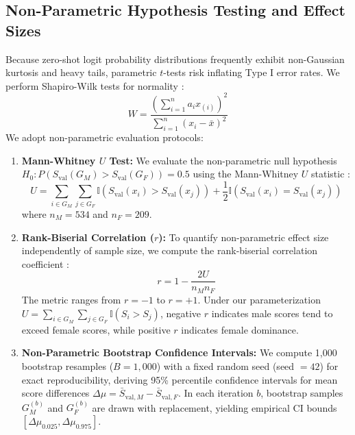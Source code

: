 \documentclass[pdflatex,sn-mathphys-num]{sn-jnl}%
\theoremstyle{thmstyleone}%
\theoremstyle{thmstyletwo}%
\theoremstyle{thmstylethree}%
\begin{document}
\subsection{Non-Parametric Hypothesis Testing and Effect Sizes}
Because zero-shot logit probability distributions frequently exhibit non-Gaussian kurtosis and heavy tails, parametric $t$-tests risk inflating Type I error rates. We perform Shapiro-Wilk tests for normality \cite{shapiro1965analysis}:
\begin{equation}
W = \frac{\left( \sum_{i=1}^{n} a_i x_{(i)} \right)^2}{\sum_{i=1}^{n} (x_i - \bar{x})^2}
\end{equation}
We adopt non-parametric evaluation protocols:
\begin{enumerate}
    \item \textbf{Mann-Whitney $U$ Test:} We evaluate the non-parametric null hypothesis $H_0: P(S_{\text{val}}(G_M) > S_{\text{val}}(G_F)) = 0.5$ using the Mann-Whitney $U$ statistic \cite{mann1947test}:
    \begin{equation}
    U = \sum_{i \in G_M} \sum_{j \in G_F} \mathbb{I}\left( S_{\text{val}}(x_i) > S_{\text{val}}(x_j) \right) + \frac{1}{2} \mathbb{I}\left( S_{\text{val}}(x_i) = S_{\text{val}}(x_j) \right)
    \end{equation}
    where $n_M = 534$ and $n_F = 209$.
    \item \textbf{Rank-Biserial Correlation ($r$):} To quantify non-parametric effect size independently of sample size, we compute the rank-biserial correlation coefficient \cite{mann1947test}:
    \begin{equation}
    r = 1 - \frac{2U}{n_M n_F}
    \end{equation}
    The metric ranges from $r = -1$ to $r = +1$. Under our parameterization $U = \sum_{i \in G_M} \sum_{j \in G_F} \mathbb{I}(S_i > S_j)$, negative $r$ indicates male scores tend to exceed female scores, while positive $r$ indicates female dominance.
    \item \textbf{Non-Parametric Bootstrap Confidence Intervals:} We compute 1,000 bootstrap resamples ($B=1,000$) with a fixed random seed (seed $= 42$) for exact reproducibility, deriving 95\% percentile confidence intervals for mean score differences $\Delta \mu = \bar{S}_{\text{val}, M} - \bar{S}_{\text{val}, F}$. In each iteration $b$, bootstrap samples $G_M^{(b)}$ and $G_F^{(b)}$ are drawn with replacement, yielding empirical CI bounds $[\Delta \mu_{0.025}, \Delta \mu_{0.975}]$.
\end{enumerate}
\end{document}
